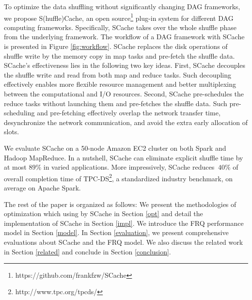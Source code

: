 {\color{black}
To optimize the data shuffling without significantly changing DAG frameworks, we propose S(huffle)Cache, an open source\footnote{https://github.com/frankfzw/SCache} plug-in system for different DAG computing frameworks.
Specifically, SCache takes over the whole shuffle phase from the underlying framework.
The workflow of a DAG framework with SCache is presented in Figure \ref{fig:workflow}. 
SCache replaces the disk operations of shuffle write by the memory copy in map tasks and pre-fetch the shuffle data.
SCache's effectiveness lies in the following two key ideas.
First, SCache decouples the shuffle write and read from both map and reduce tasks.
Such decoupling effectively enables more flexible resource management and better multiplexing between the computational and I/O resources.
Second, SCache pre-schedules the reduce tasks without launching them and pre-fetches the shuffle data. 
Such pre-scheduling and pre-fetching effectively overlap the network transfer time, desynchronize the network communication, 
and avoid the extra early allocation of slots.

We evaluate SCache on a 50-node Amazon EC2 cluster on both Spark and Hadoop MapReduce.
In a nutshell, SCache can eliminate explicit shuffle time by at most $89\%$ in varied applications. More impressively, SCache reduces $~40\%$ of overall completion time of TPC-DS\footnote{http://www.tpc.org/tpcds/}, a standardized industry benchmark, on average on Apache Spark.

The rest of the paper is organized as follows:
{\color{black}
We present the methodologies of optimization which using by SCache in Section \ref{opt} and detail the implementation of SCache in Section \ref{impl}.
We introduce the FRQ performance model in Section \ref{model}.
In Section \ref{evaluation}, we present comprehensive evaluations about SCache and the FRQ model.
We also discuss the related work in Section \ref{related} and conclude in Section \ref{conclusion}.
}
}

